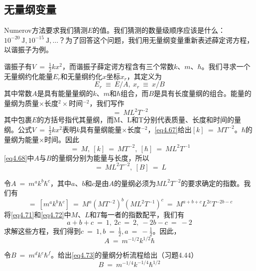 \documentclass[12pt,a4paper,openany]{ctexbook}
\begin{document}
\subsection{无量纲变量}
\begin{flushleft}
    \setlength{\parindent}{2em}
Numerov方法要求我们猜测$E$的值。我们猜测的数量级顺序应该是什么：$10^{-20}\ \text{J},10^{-15}\ \text{J},\dots$？为了回答这个问题，我们用无量纲变量重新表述薛定谔方程，以谐振子为例。

谐振子有$V\ =\ \frac{1}{2}kx^2$，而谐振子薛定谔方程含有三个常数$k$、$m$、$\hbar$。我们寻求一个无量纲约化能量$E_r$和无量纲约化$x$坐标$x_r$，其定义为
\begin{equation}
    E_r\ \equiv\ E/A,\ x_r\ \equiv\ x/B \label{eq4.68}
\end{equation}
其中常数$A$是具有能量量纲的$k$、$m$和$\hbar$组合，而$B$是具有长度量纲的组合。能量的量纲为质量$\times$长度$^2\times$时间$^{-2}$，我们写作
\begin{equation}
    [E]\ =\ ML^2T^{-2} \label{eq4.69}
\end{equation}
其中包裹$E$的方括号指代其量纲，而M、L和T分别代表质量、长度和时间的量纲。公式$V\ =\ \frac{1}{2}kx^2$表明$k$具有量纲能量$\times$长度$^{-2}$，\eqref{eq4.67}给出$[k]\ =\ MT^{-2}$。$\hbar$的量纲为能量$\times$时间。因此
\begin{equation}
    [m]\ =\ M,\ [k]\ =\ MT^{-2},\ [\hbar]\ =\ ML^2T^{-1} \label{eq4.70}
\end{equation}
\eqref{eq4.68}中$A$与$B$的量纲分别为能量与长度，所以
\begin{equation}
    [A]\ =\ ML^2T^{-2},\ [B]\ =\ L \label{eq4.71}
\end{equation}

令$A\ =\ m^ak^b\hbar^c$，其中$a$、$b$和$c$是由$A$的量纲必须为$ML^2T^{-2}$的要求确定的指数。我们有
\begin{equation}
    [A]\ =\ [m^ak^b\hbar^c]\ =\ M^a(MT^{-2})^b(ML^2T^{-1})^c\ =\ M^{a+b+c}L^{2c}T^{-2b-c} \label{eq4.72} 
\end{equation}
将\eqref{eq4.71}和\eqref{eq4.72}中$M$、$L$和$T$每一者的指数配平，我们有
\begin{equation*}
    a+b+c\ =\ 1,\ 2c\ =\ 2,\ -2b-c\ =\ -2
\end{equation*}
求解这些方程，我们得到$c\ =\ 1,b\ =\ \frac{1}{2},a\ =\ -\frac{1}{2}$。因此，
\begin{equation}
    A\ =\ m^{-1/2}k^{1/2}\hbar \label{eq4.73}
\end{equation}

令$B\ =\ m^dk^e\hbar^f$。给出\eqref{eq4.73}的量纲分析流程给出（习题4.44）
\begin{equation}
    B\ =\ m^{-1/4}k^{-1/4}\hbar^{1/2} \label{eq4.74}
\end{equation}


\end{flushleft}
\end{document}
